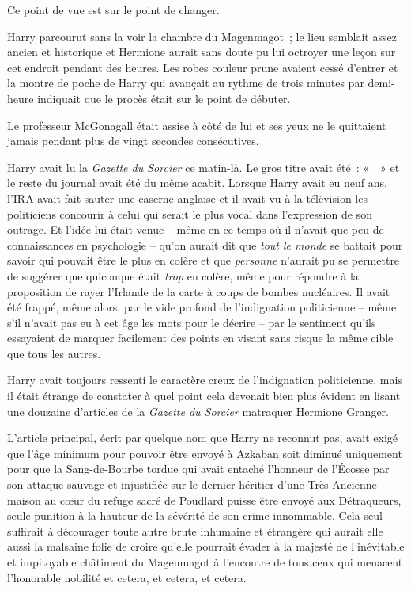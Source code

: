 Ce point de vue est sur le point de changer.

\later

Harry parcourut sans la voir la chambre du Magenmagot~; le lieu semblait assez ancien et historique et Hermione aurait sans doute pu lui octroyer une leçon sur cet endroit pendant des heures.
Les robes couleur prune avaient cessé d'entrer et la montre de poche de Harry qui avançait au rythme de trois minutes par demi-heure indiquait que le procès était sur le point de débuter.

Le professeur McGonagall était assise à côté de lui et ses yeux ne le quittaient jamais pendant plus de vingt secondes consécutives.

Harry avait lu la \emph{Gazette du Sorcier} ce matin-là.
Le gros titre avait été~: «~~» et le reste du journal avait été du même acabit.
Lorsque Harry avait eu neuf ans, l'IRA avait fait sauter une caserne anglaise et il avait vu à la télévision les politiciens concourir à celui qui serait le plus vocal dans l'expression de son outrage.
Et l'idée lui était venue -- même en ce temps où il n'avait que peu de connaissances en psychologie -- qu'on aurait dit que \emph{tout le monde} se battait pour savoir qui pouvait être le plus en colère et que \emph{personne} n'aurait pu se permettre de suggérer que quiconque était \emph{trop} en colère, même pour répondre à la proposition de rayer l'Irlande de la carte à coups de bombes nucléaires.
Il avait été frappé, même alors, par le vide profond de l'indignation politicienne -- même s'il n'avait pas eu à cet âge les mots pour le décrire -- par le sentiment qu'ils essayaient de marquer facilement des points en visant sans risque la même cible que tous les autres.

Harry avait toujours ressenti le caractère creux de l'indignation politicienne, mais il était étrange de constater à quel point cela devenait bien plus évident en lisant une douzaine d'articles de la \emph{Gazette du Sorcier} matraquer Hermione Granger.

L'article principal, écrit par quelque nom que Harry ne reconnut pas, avait exigé que l'âge minimum pour pouvoir être envoyé à Azkaban soit diminué uniquement pour que la Sang-de-Bourbe tordue qui avait entaché l'honneur de l'Écosse par son attaque sauvage et injustifiée sur le dernier héritier d'une Très Ancienne maison au cœur du refuge sacré de Poudlard puisse être envoyé aux Détraqueurs, seule punition à la hauteur de la sévérité de son crime innommable.
Cela seul suffirait à décourager toute autre brute inhumaine et étrangère qui aurait elle aussi la malsaine folie de croire qu'elle pourrait évader à la majesté de l'inévitable et impitoyable châtiment du Magenmagot à l'encontre de tous ceux qui menacent l'honorable nobilité et cetera, et cetera, et cetera. 

